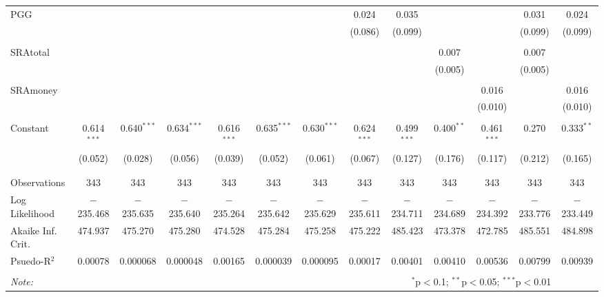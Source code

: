 \documentclass[12pt]{article}
\begin{document}
\begin{table}[!htbp]
\begin{adjustbox}{width=\textwidth}
\begin{tabular}{@{\extracolsep{5pt}}lcccccccccccc}
 PGG &  &  &  &  &  &  & 0.024 & 0.035 &  &  & 0.031 & 0.024 \\ 
  &  &  &  &  &  &  & (0.086) & (0.099) &  &  & (0.099) & (0.099) \\ 
  & & & & & & & & & & & & \\ 
 SRAtotal &  &  &  &  &  &  &  &  & 0.007 &  & 0.007 &  \\ 
  &  &  &  &  &  &  &  &  & (0.005) &  & (0.005) &  \\ 
  & & & & & & & & & & & & \\ 
 SRAmoney &  &  &  &  &  &  &  &  &  & 0.016 &  & 0.016 \\ 
  &  &  &  &  &  &  &  &  &  & (0.010) &  & (0.010) \\ 
  & & & & & & & & & & & & \\ 
 Constant & 0.614$^{***}$ & 0.640$^{***}$ & 0.634$^{***}$ & 0.616$^{***}$ & 0.635$^{***}$ & 0.630$^{***}$ & 0.624$^{***}$ & 0.499$^{***}$ & 0.400$^{**}$ & 0.461$^{***}$ & 0.270 & 0.333$^{**}$ \\ 
  & (0.052) & (0.028) & (0.056) & (0.039) & (0.052) & (0.061) & (0.067) & (0.127) & (0.176) & (0.117) & (0.212) & (0.165) \\ 
  & & & & & & & & & & & & \\ 
\hline \\[-1.8ex] 
Observations & 343 & 343 & 343 & 343 & 343 & 343 & 343 & 343 & 343 & 343 & 343 & 343 \\ 
Log Likelihood & $-$235.468 & $-$235.635 & $-$235.640 & $-$235.264 & $-$235.642 & $-$235.629 & $-$235.611 & $-$234.711 & $-$234.689 & $-$234.392 & $-$233.776 & $-$233.449 \\ 
Akaike Inf. Crit. & 474.937 & 475.270 & 475.280 & 474.528 & 475.284 & 475.258 & 475.222 & 485.423 & 473.378 & 472.785 & 485.551 & 484.898 \\ 
Psuedo-R$^{2}$ & 0.00078 & 0.000068 & 0.000048 & 0.00165 & 0.000039 & 0.000095 & 0.00017 & 0.00401 & 0.00410 & 0.00536 & 0.00799 & 0.00939 \\
\hline 
\hline \\[-1.8ex] 
\textit{Note:}  & \multicolumn{11}{r}{$^{*}$p$<$0.1; $^{**}$p$<$0.05; $^{***}$p$<$0.01} \\ 
\end{tabular} 
\end{adjustbox}
\end{table}


\newpage
\end{document}
